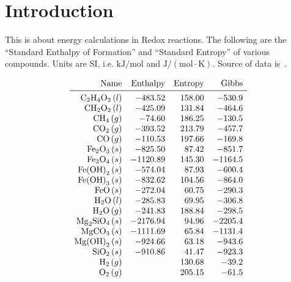 \documentclass[a4paper,14pt]{extarticle}
\def\H{{\rm H}}
\def\O{{\rm O}}
\def\C{{\rm C}}
\def\Fe{{\rm Fe}}
\def\Mg{{\rm Mg}}
\def\Si{{\rm Si}}
\begin{document}

\section{Introduction}

This is about energy calculations in Redox reactions.
The following are the ``Standard Enthalpy of Formation'' and ``Standard Entropy'' of
various compounds. Units are SI, i.e. $\text{kJ}/\text{mol}$ and $\text{J}/(\text{mol}\cdot \text{K})$.
Source of data is~\cite{nist}.

\[
\begin{array}{rrrr}
    \text{Name}      & \text{Enthalpy} & \text{Entropy} & \text{Gibbs} \\
   \midrule
    \C_2\H_4\O_2 \,(l)  &  -483.52 & 158.00  &  -530.9 \\
    \C\H_2\O_2 \,(l)    &  -425.09 & 131.84  &  -464.6 \\
    \C\H_4 \,(g)        &   -74.60 & 186.25  &  -130.5 \\
    \C\O_2 \,(g)        &  -393.52 & 213.79  &  -457.7 \\
    \C\O \,(g)          &  -110.53 & 197.66  &  -169.8 \\
    \Fe_2\O_3 \,(s)     &  -825.50 &  87.42  &  -851.7 \\
    \Fe_3\O_4 \,(s)     & -1120.89 & 145.30  & -1164.5 \\
    \Fe{(\O\H)}_2 \,(s) &  -574.04 &  87.93  &  -600.4 \\
    \Fe{(\O\H)}_3 \,(s) &  -832.62 & 104.56  &  -864.0 \\
    \Fe\O \,(s)         &  -272.04 &  60.75  &  -290.3 \\
    \H_2\O \,(l)        &  -285.83 &  69.95  &  -306.8 \\
    \H_2\O \,(g)        &  -241.83 & 188.84  &  -298.5 \\
    \Mg_2\Si\O_4 \,(s)  & -2176.94 &  94.96  & -2205.4 \\
    \Mg\C\O_3 \,(s)     & -1111.69 &  65.84  & -1131.4 \\
    \Mg{(\O\H)}_2 \,(s) &  -924.66 &  63.18  &  -943.6 \\
    \Si\O_2 \,(s)       &  -910.86 &  41.47  &  -923.3 \\
    \H_2 \,(g)          &          & 130.68  &   -39.2 \\
    \O_2 \,(g)          &          & 205.15  &   -61.5
\end{array}
\]
\end{document}
